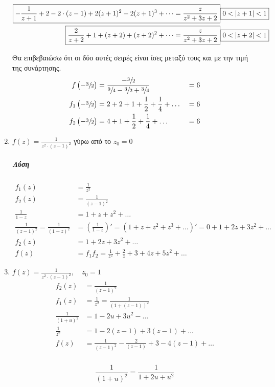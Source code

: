 \documentclass[12pt,a4paper,titlepage,fleqn]{article}
\begin{document}
\begin{enumerate}
	\subparagraph{}
	\begin{align*}
		\Aboxed{-\frac{1}{z+1} +2 -2\cdot(z-1)+2(z+1)^2-2(z+1)^3+\dots &=
			\frac{z}{z^2+3z+2}
			} \boxed{0<|z+1|<1} \\
		\Aboxed{\frac{2}{z+2} +1 +(z+2)+(z+2)^2+\dots &=
			\frac{z}{z^2+3z+2}
		} \boxed{0<|z+2|<1} \\
	\end{align*}
	
	Θα επιβεβαιώσω ότι οι δύο αυτές σειρές είναι ίσες μεταξύ τους και με την τιμή της
	συνάρτησης.
	\begin{alignat*}{2}
	f\left(-\sfrac{3}{2} \right) &= \frac{-\sfrac{3}{2} }{\sfrac{9}{4}
		-\sfrac{3}{2}+\sfrac{3}{4}   } &&= 6 \\
	f_1\left(-\sfrac{3}{2} \right) &= 2 + 2 + 1 + \frac{1}{2} + \frac{1}{4} + \dots &&= 6
	\\
	f_2\left(-\sfrac{3}{2} \right) &= 4 + 1 + \frac{1}{2} + \frac{1}{4} + \dots &&= 6
	\end{alignat*}
	
	
  \item \( f(z) = \frac{1}{z^2\cdot(z-1)^2} \) γύρω από το \( z_0 = 0 \)
  \subparagraph{Λύση}
  \begin{align*}
  f_1(z) &= \frac{1}{z^2} \\
  f_2(z) &= \frac{1}{(z-1)^2} \\
  \frac{1}{1-z} &= 1 + z + z^2 + \dots \\
  \frac{1}{(z-1)^2} = \frac{1}{(1-z)^2} &= \left( \frac{1}{1-z} \right)' =
   (1+z+z^2+z^3+\dots)' =
   0+1+2z+3z^2+\dots
  \\ f_2(z) &= 1+2z+3z^2+\dots \\
  f(z) &= f_1f_2 = \frac{1}{z^2} + \frac{2}{z} + 3 + 4z + 5z^2 + \dots
  \end{align*}
  
  \item \( f(z) = \frac{1}{z^2\cdot(z-1)^2},\quad z_0 = 1 \)
  \begin{align*}
  f_2(z) &= \frac{1}{(z-1)^2} \\
  f_1(z) &= \frac{1}{z^2} = \frac{1}{\left(1+(z-1)\right)^2} \\
  \frac{1}{(1+u)^2} &= 1 - 2u + 3u^2 - \dots \\
  \frac{1}{z^2} &= 1-2(z-1)+3(z-1) + \dots \\
  f(z) &= \frac{1}{(z-1)^2} - \frac{2}{(z-1)} + 3 - 4(z-1) + \dots
  \end{align*}
  
  \subparagraph{}
  \[
  \frac{1}{(1+u)^2} = \frac{1}{1+2u+u^2}
  \]
  

\end{enumerate}
\end{document}
